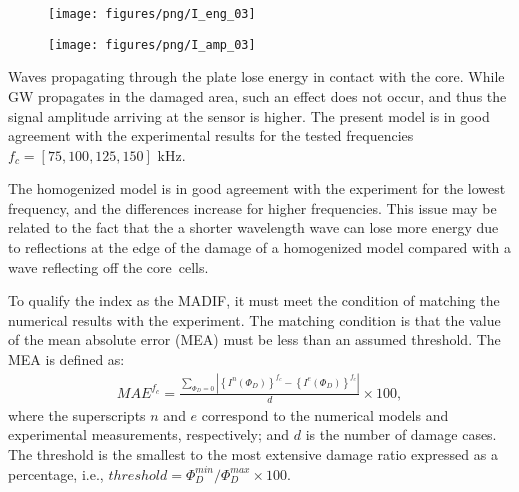\documentclass[sensors,article,accept,moreauthors,pdftex]{Definitions/mdpi}
\begin{document}
\begin{paracol}{2}
\vspace{-6pt}
\begin{figure}[H]
		\texttt{[image: figures/png/I\_eng\_03]}
	\caption{}
	\label{fig:madif_eng}
\end{figure}
\vspace{-9pt}
\begin{figure}[H]
		\texttt{[image: figures/png/I\_amp\_03]}
	\caption{}
	\label{fig:madif_amp}
\end{figure}


Waves propagating through the plate lose energy in contact with the core.
While GW propagates in the damaged area, such an effect does not occur, and thus the signal amplitude arriving at the sensor is higher.
The present model is in good agreement with the experimental results for the tested frequencies  \(f_c=[75, 100, 125, 150]\) kHz. 


The homogenized model is in good agreement with the experiment for the lowest frequency, and the differences increase for higher frequencies.
This issue may be related to the fact that the  a shorter wavelength wave can lose more energy due to reflections at the edge of the damage of a homogenized model compared with a wave reflecting off the core~cells.

To qualify the index as the MADIF, it must meet the condition of matching the numerical results with the experiment.
The matching condition is that the value of the mean absolute error (MEA) must be less than an assumed threshold.
The MEA is defined as:
\begin{eqnarray}
	MAE^{f_c} = \frac{\sum_{\Phi_D=0}{\left |\left\{I^{n}(\Phi_D)\right\}^{f_c}-\left\{I^{e}(\Phi_D)\right\}^{f_c}\right |}}{d}\times100,
\end{eqnarray}
where the superscripts \(n\) and \(e\) correspond to the numerical models and experimental measurements, respectively; and \(d\) is the number of damage cases. The threshold is the smallest to the most extensive damage ratio expressed as a percentage, i.e., \(threshold=\Phi_D^{min}/\Phi_D^{max}\times100\).


\end{paracol}
\end{document}
